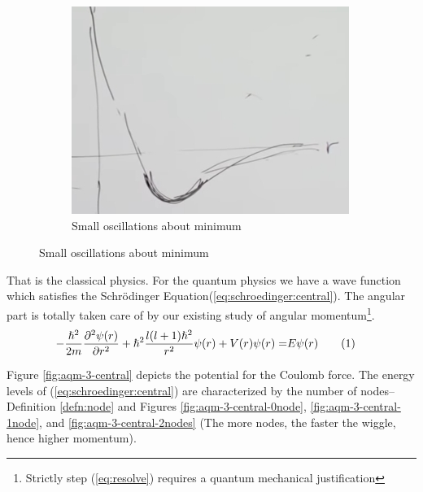 \documentclass[]{article}
\newcommand\numberthis{\addtocounter{equation}{1}\tag{\theequation}}
\begin{document}
\begin{figure}[H]
\begin{subfigure}[t]{0.3\textwidth}
	\end{subfigure}
	\quad
	\begin{subfigure}[t]{0.3\textwidth}
		\caption{Small oscillations about minimum}\label{fig:aqm-3-central-osc}
		\includegraphics[width=\textwidth]{aqm-3-central-osc}
	\end{subfigure}
\end{figure}

That is the classical physics. For the quantum physics we have a wave function which satisfies the Schr\"odinger Equation(\ref{eq:schroedinger:central}). The angular part is totally taken care of by our existing study of angular momentum\footnote{Strictly step (\ref{eq:resolve}) requires a quantum mechanical justification}.
\begin{align*}
	-\frac{\hslash^2}{2m}\frac{\partial^2 \psi(r)}{\partial r^2} + \hslash^2 \frac{l(l+1)\hslash^2}{r^2}\psi(r)+V(r)\psi(r) =& E\psi(r)\numberthis \label{eq:schroedinger:central}
\end{align*}

Figure \ref{fig:aqm-3-central} depicts the potential for the Coulomb force. The energy levels of (\ref{eq:schroedinger:central}) are characterized by the number of nodes--Definition \ref{defn:node} and Figures \ref{fig:aqm-3-central-0node}, \ref{fig:aqm-3-central-1node}, and \ref{fig:aqm-3-central-2nodes} (The more nodes, the faster the wiggle, hence higher momentum).
\end{document}
